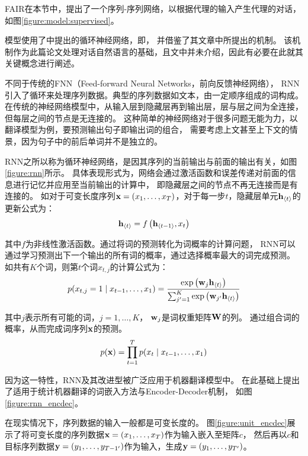 FAIR在本节中，提出了一个序列-序列网络，以根据代理的输入产生代理的对话，如图\ref{figure:model:supervised}。

模型使用了\citet{  Cho-18,  Cho-28}中提出的循环神经网络，即，
并借鉴了其文章中所提出的机制。
该机制作为此篇论文处理对话自然语言的基础，且文中并未介绍，因此有必要在此就其关键概念进行阐述。


不同于传统的FNN（Feed-forward Neural Networks，前向反馈神经网络），
RNN引入了循环来处理序列数据。典型的序列数据如文本，由一定顺序组成的词构成。
在传统的神经网络模型中，从输入层到隐藏层再到输出层，层与层之间为全连接，但每层之间的节点是无连接的。
这种简单的神经网络对于很多问题无能为力，以翻译模型为例，要预测输出句子即输出词的组合，
需要考虑上文甚至上下文的情景，因为句子中的前后单词并不是独立的。

RNN之所以称为循环神经网络，是因其序列的当前输出与前面的输出有关，如图\ref{figure:rnn}所示。
具体表现形式为，网络会通过激活函数和误差传递对前面的信息进行记忆并应用至当前输出的计算中，
即隐藏层之间的节点不再无连接而是有连接的。
如对于可变长度序列$\mathbf{x}=(x_1, \dots, x_T)$，对于每一步$t$，隐藏层单元$\mathbf{h}_{\left<t\right>}$的更新公式为：
\begin{equation}
    \label{eq:rnn_hidden_unit_update}
    \mathbf{h}_{\left<t\right>} = f\left( \mathbf{h}_{\left<t-1\right>}, x_t \right)
\end{equation}

其中$f$为非线性激活函数。通过将词的预测转化为词概率的计算问题，
RNN可以通过学习预测出下一个输出的所有词的概率，通过选择概率最大的词完成预测。
如共有$K$个词，则第$t$个词$x_{t,j}$的计算公式为：
\begin{equation}
    \label{eq:rnn_word_prediction}
    p(x_{t,j} = 1 \mid x_{t-1}, \dots, x_1) = \frac{\exp \left(
        \mathbf{w}_j \mathbf{h}_{\left<t\right>}\right) } {\sum_{j'=1}^{K} \exp \left( \mathbf{w}_{j'}
        \mathbf{h}_{\left<t\right>}\right) }
\end{equation}

其中$j$表示所有可能的词，$j=1,\dots,K$，
$\mathbf{w}_j$是词权重矩阵$\mathbf{W}$的列。
通过组合词的概率，从而完成词序列$\mathbf{x}$的预测。
\begin{equation}
    p(\mathbf{x}) = \prod_{t=1}^T p(x_t \mid x_{t-1}, \dots, x_1)
\end{equation}

因为这一特性，RNN及其改进型被广泛应用于机器翻译模型中。
\citet{  Cho-28}在此基础上提出了适用于统计机器翻译的词嵌入方法与Encoder-Decoder机制，
如图\ref{figure:rnn_encdec}。

在现实情况下，序列数据的输入一般都是可变长度的。
图\ref{figure:unit_encdec}展示了将可变长度的序列数据$\mathbf{x}=(x_1, \dots, x_T)$作为输入嵌入至矩阵$c$，
然后再以$c$和目标序列数据$\mathbf{y}=(y_1, \dots, y_{T-1'})$作为输入，生成$\mathbf{y}=(y_1, \dots, y_{T'})$。

